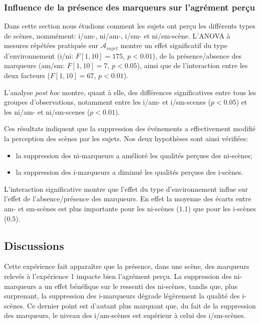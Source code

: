 \documentclass[twoside,twocolumn]{article}
\begin{document}
\subsubsection{Influence de la présence des marqueurs sur l'agrément perçu}


Dans cette section nous étudions comment les sujets ont perçu les différents types de scènes, nommément: i/am-, ni/am-, i/sm- et ni/sm-scène. L'ANOVA à mesures répétées pratiquée sur $\mathcal{A}_{sujet}$ montre un effet significatif du type d'environnement (i/ni: $F[1,10]=175$, $p<0.01$), de la présence/absence des marqueurs (am/sm: $F[1,10]=7$, $p<0.05$), ainsi que de l'interaction entre les deux facteurs ($F[1,10]=67$, $p<0.01$).

L'analyse \emph{post hoc} montre, quant à elle, des différences significatives entre tous les groupes d'observations, notamment entre les i/am- et i/sm-scenes ($p<0.05$) et les ni/am- et ni/sm-scenes ($p<0.01$).

Ces résultats indiquent que la suppression des événements a effectivement modifié la perception des scènes par les sujets. Nos deux hypothèses sont ainsi vérifiées:

\begin{itemize}
\item la suppression des ni-marqueurs a amélioré les qualités perçues des ni-scènes;
\item la suppression des i-marqueurs a diminué les qualités perçues des i-scènes.
\end{itemize}

L'interaction significative montre que l'effet du type d'environnement influe sur l'effet de l'absence/présence des marqueurs. En effet la moyenne des écarts entre am- et sm-scènes est plus importante pour les ni-scènes ($1.1$) que pour les i-scènes ($0.5$).

\subsection{Discussions}

Cette expérience fait apparaître que la présence, dans une scène, des marqueurs relevés à l'expérience 1 impacte bien l'agrément perçu. La suppression des ni-marqueurs a un effet bénéfique sur le ressenti des ni-scènes, tandis que, plus surprenant, la suppression des i-marqueurs dégrade légèrement la qualité des i-scènes. Ce dernier point est d'autant plus marquant que, du fait de la suppression des marqueurs, le niveau des i/am-scènes est supérieur à celui des i/sm-scènes.
\end{document}
